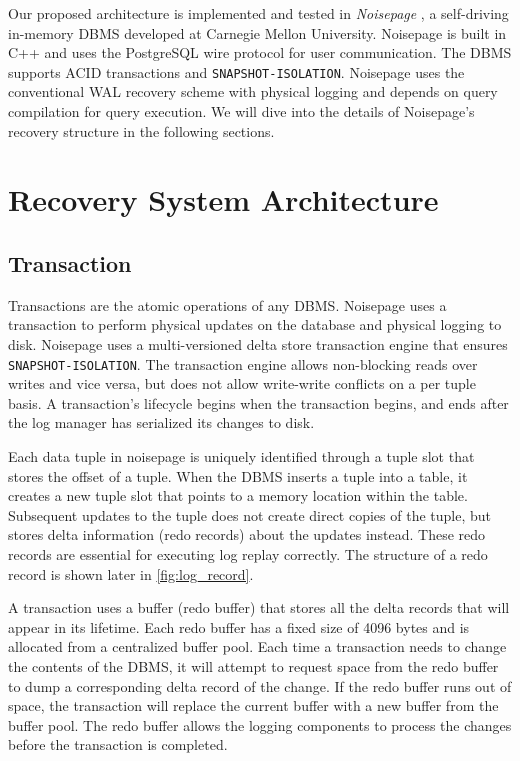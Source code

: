 \documentclass[12pt]{cmuthesis}
\begin{document}
Our proposed architecture is implemented and tested in \textit{Noisepage} \cite{noisepage}, a self-driving in-memory DBMS developed at Carnegie Mellon University. Noisepage is built in C++ and uses the PostgreSQL wire protocol for user communication. The DBMS supports ACID transactions and \texttt{SNAPSHOT-ISOLATION}. Noisepage uses the conventional WAL recovery scheme with physical logging and depends on query compilation for query execution. We will dive into the details of Noisepage's recovery structure in the following sections.

\section{Recovery System Architecture}
\subsection{Transaction}
Transactions are the atomic operations of any DBMS. Noisepage uses a transaction to perform physical updates on the database and physical logging to disk. Noisepage uses a multi-versioned delta store transaction engine that ensures \texttt{SNAPSHOT-ISOLATION}. The transaction engine allows non-blocking reads over writes and vice versa, but does not allow write-write conflicts on a per tuple basis. A transaction's lifecycle begins when the transaction begins, and ends after the log manager has serialized its changes to disk.

Each data tuple in noisepage is uniquely identified through a tuple slot that stores the offset of a tuple. When the DBMS inserts a tuple into a table, it creates a new tuple slot that points to a memory location within the table. Subsequent updates to the tuple does not create direct copies of the tuple, but stores delta information (redo records) about the updates instead. These redo records are essential for executing log replay correctly. The structure of a redo record is shown later in \ref{fig:log_record}.

A transaction uses a buffer (redo buffer) that stores all the delta records that will appear in its lifetime. Each redo buffer has a fixed size of 4096 bytes and is allocated from a centralized buffer pool. Each time a transaction needs to change the contents of the DBMS, it will attempt to request space from the redo buffer to dump a corresponding delta record of the change. If the redo buffer runs out of space, the transaction will replace the current buffer with a new buffer from the buffer pool. The redo buffer allows the logging components to process the changes before the transaction is completed.
\end{document}
